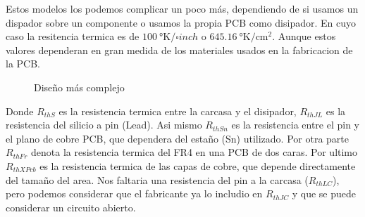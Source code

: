 
Estos modelos los podemos complicar un poco más, dependiendo de si usamos un dispador sobre un componente o
usamos la propia PCB como disipador. En cuyo caso la resitencia termica es
de $\SI{100}{\degree\kelvin/\square{inch}}$ o $\SI{645.16}{\degree\kelvin/\square\cm}$.
Aunque estos valores dependeran en gran medida de los materiales usados en la
fabricacion de la PCB.


\begin{figure}[H]
    \centering
    
    \caption{Diseño más complejo}
    \label{fig:ThermalEquivFull}
\end{figure}

Donde $R_{thS}$ es la resistencia termica entre la carcasa y el disipador, $R_{thJL}$ es la
resistencia del silicio a pin (Lead). Asi mismo $R_{thSn}$ es la resistencia entre el pin
y el plano de cobre PCB, que dependera del estaño (Sn) utilizado. Por otra parte $R_{thFr}$
denota la resistencia termica del FR4 en una PCB de dos caras. Por ultimo $R_{thXPcb}$ es la
resistencia termica de las capas de cobre, que depende directamente del tamaño del area.
Nos faltaria una resistencia del pin a la carcasa ($R_{thLC}$), pero podemos considerar que el fabricante ya lo includio en $R_{thJC}$ y que se puede considerar un circuito abierto.

